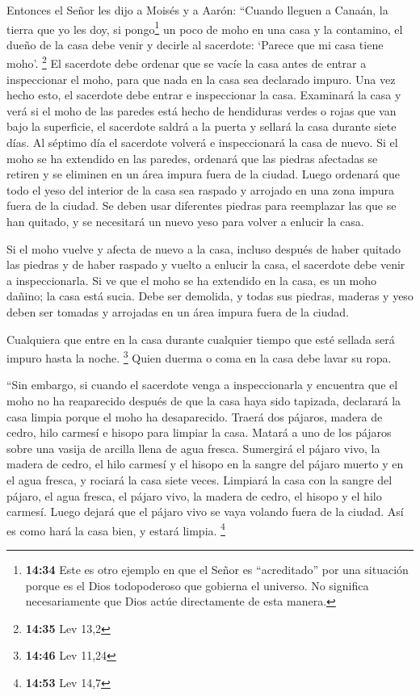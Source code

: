  Entonces el Señor les dijo a Moisés y a Aarón:
 ``Cuando lleguen a Canaán, la tierra que yo les doy, si
pongo\footnote{\textbf{14:34} Este es otro ejemplo en que el Señor es
  ``acreditado'' por una situación porque es el Dios todopoderoso que
  gobierna el universo. No significa necesariamente que Dios actúe
  directamente de esta manera.} un poco de moho en una casa y la
contamino,  el dueño de la casa debe venir y decirle al
sacerdote: `Parece que mi casa tiene moho'. \footnote{\textbf{14:35} Lev
  13,2}  El sacerdote debe ordenar que se vacíe la casa
antes de entrar a inspeccionar el moho, para que nada en la casa sea
declarado impuro. Una vez hecho esto, el sacerdote debe entrar e
inspeccionar la casa.  Examinará la casa y verá si el
moho de las paredes está hecho de hendiduras verdes o rojas que van bajo
la superficie,  el sacerdote saldrá a la puerta y sellará
la casa durante siete días.  Al séptimo día el sacerdote
volverá e inspeccionará la casa de nuevo. Si el moho se ha extendido en
las paredes,  ordenará que las piedras afectadas se
retiren y se eliminen en un área impura fuera de la ciudad.
 Luego ordenará que todo el yeso del interior de la casa
sea raspado y arrojado en una zona impura fuera de la ciudad.
 Se deben usar diferentes piedras para reemplazar las que
se han quitado, y se necesitará un nuevo yeso para volver a enlucir la
casa.

 Si el moho vuelve y afecta de nuevo a la casa, incluso
después de haber quitado las piedras y de haber raspado y vuelto a
enlucir la casa,  el sacerdote debe venir a
inspeccionarla. Si ve que el moho se ha extendido en la casa, es un moho
dañino; la casa está sucia.  Debe ser demolida, y todas
sus piedras, maderas y yeso deben ser tomadas y arrojadas en un área
impura fuera de la ciudad.

 Cualquiera que entre en la casa durante cualquier tiempo
que esté sellada será impuro hasta la noche. \footnote{\textbf{14:46}
  Lev 11,24}  Quien duerma o coma en la casa debe lavar
su ropa.

 ``Sin embargo, si cuando el sacerdote venga a
inspeccionarla y encuentra que el moho no ha reaparecido después de que
la casa haya sido tapizada, declarará la casa limpia porque el moho ha
desaparecido.  Traerá dos pájaros, madera de cedro, hilo
carmesí e hisopo para limpiar la casa.  Matará a uno de
los pájaros sobre una vasija de arcilla llena de agua fresca.
 Sumergirá el pájaro vivo, la madera de cedro, el hilo
carmesí y el hisopo en la sangre del pájaro muerto y en el agua fresca,
y rociará la casa siete veces.  Limpiará la casa con la
sangre del pájaro, el agua fresca, el pájaro vivo, la madera de cedro,
el hisopo y el hilo carmesí.  Luego dejará que el pájaro
vivo se vaya volando fuera de la ciudad. Así es como hará la casa bien,
y estará limpia. \footnote{\textbf{14:53} Lev 14,7}

